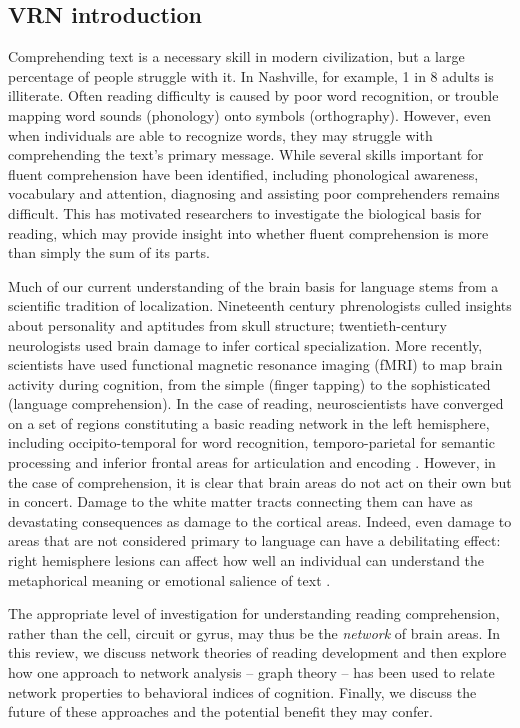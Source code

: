 \subsection{VRN introduction}

Comprehending text is a necessary skill in modern civilization, but a large percentage of people struggle with it. In Nashville, for example, 1 in 8 adults is illiterate. Often reading difficulty is caused by poor word recognition, or trouble mapping word sounds (phonology) onto symbols (orthography). However, even when individuals are able to recognize words, they may struggle with comprehending the text's primary message. While several skills important for fluent comprehension have been identified, including phonological awareness, vocabulary and attention, diagnosing and assisting poor comprehenders remains difficult. This has motivated researchers to investigate the biological basis for reading, which may provide insight into whether fluent comprehension is more than simply the sum of its parts. 

Much of our current understanding of the brain basis for language stems from a scientific tradition of localization. Nineteenth century phrenologists culled insights about personality and aptitudes from skull structure; twentieth-century neurologists used brain damage to infer cortical specialization. More recently, scientists have used functional magnetic resonance imaging (fMRI) to map brain activity during cognition, from the simple (finger tapping) to the sophisticated (language comprehension). In the case of reading, neuroscientists have converged on a set of regions constituting a basic reading network in the left hemisphere, including occipito-temporal for word recognition, temporo-parietal for semantic processing and inferior frontal areas for articulation and encoding  \cite{Price2012}. However, in the case of comprehension, it is clear that brain areas do not act on their own but in concert. Damage to the white matter tracts connecting them can have as devastating consequences as damage to the cortical areas. Indeed, even damage to areas that are not considered primary to language can have a debilitating effect: right hemisphere lesions can affect how well an individual can understand the metaphorical meaning or emotional salience of text \cite{Ferstl2008, Vigneau2011}.

The appropriate level of investigation for understanding reading comprehension, rather than the cell, circuit or gyrus, may thus be the \textit{network} of brain areas. In this review, we discuss network theories of reading development and then explore how one approach to network analysis -- graph theory --  has been used to relate network properties to behavioral indices of cognition. Finally, we discuss the future of these approaches and the potential benefit they may confer. 


